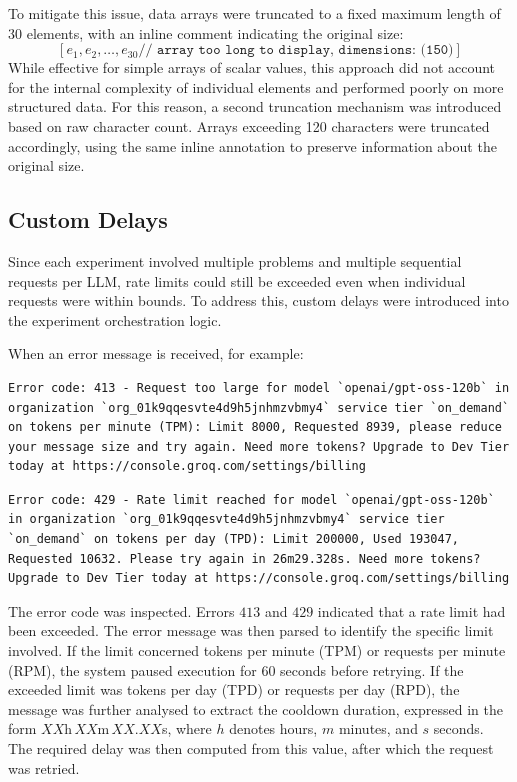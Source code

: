 \documentclass[../../main]{subfiles}
\begin{document}
To mitigate this issue, data arrays were truncated to a fixed maximum length of 30 elements, with an inline comment indicating the original size:
\[ 
[e_1,e_2,\dots,e_{30} \texttt{// array too long to display, dimensions: (150)} ]
\]
While effective for simple arrays of scalar values, this approach did not account for the internal complexity of individual elements and performed poorly on more structured data. For this reason, a second truncation mechanism was introduced based on raw character count. Arrays exceeding 120 characters were truncated accordingly, using the same inline annotation to preserve information about the original size. 

\subsection{Custom Delays}
Since each experiment involved multiple problems and multiple sequential requests per LLM, rate limits could still be exceeded even when individual requests were within bounds. To address this, custom delays were introduced into the experiment orchestration logic.

When an error message is received, for example:

\begin{lstlisting}
Error code: 413 - Request too large for model `openai/gpt-oss-120b` in organization `org_01k9qqesvte4d9h5jnhmzvbmy4` service tier `on_demand` on tokens per minute (TPM): Limit 8000, Requested 8939, please reduce your message size and try again. Need more tokens? Upgrade to Dev Tier today at https://console.groq.com/settings/billing
\end{lstlisting}

\begin{lstlisting}
Error code: 429 - Rate limit reached for model `openai/gpt-oss-120b` in organization `org_01k9qqesvte4d9h5jnhmzvbmy4` service tier `on_demand` on tokens per day (TPD): Limit 200000, Used 193047, Requested 10632. Please try again in 26m29.328s. Need more tokens? Upgrade to Dev Tier today at https://console.groq.com/settings/billing
\end{lstlisting}

The error code was inspected. Errors $413$ and $429$ indicated that a rate limit had been exceeded. The error message was then parsed to identify the specific limit involved. If the limit concerned tokens per minute (TPM) or requests per minute (RPM), the system paused execution for 60 seconds before retrying. If the exceeded limit was tokens per day (TPD) or requests per day (RPD), the message was further analysed to extract the cooldown duration, expressed in the form $XX$h\,$XX$m\,$XX.XX$s, where $h$ denotes hours, $m$ minutes, and $s$ seconds. The required delay was then computed from this value, after which the request was retried.
\end{document}

